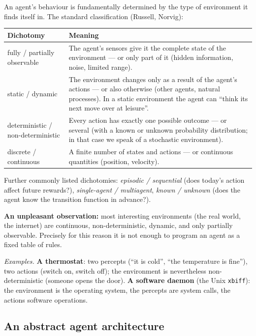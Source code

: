 \documentclass[11pt,a4paper]{article}
\theoremstyle{definition}
\providecommand{\uv}[1]{``#1''}
\begin{document}
An agent's behaviour is fundamentally determined by the type of environment it finds itself in.
The standard classification (Russell, Norvig):

\begin{center}
\begin{tabular}{p{} p{}}
\toprule
\textbf{Dichotomy} & \textbf{Meaning} \\
\midrule
fully / partially observable
  & The agent's sensors give it the complete state of the environment --- or only part of it
    (hidden information, noise, limited range). \\
static / dynamic
  & The environment changes only as a result of the agent's actions --- or also otherwise (other
    agents, natural processes). In a static environment the agent can \uv{think its next move over
    at leisure}. \\
deterministic / non-deterministic
  & Every action has exactly one possible outcome --- or several (with a known or unknown
    probability distribution; in that case we speak of a stochastic environment). \\
discrete / continuous
  & A finite number of states and actions --- or continuous quantities (position, velocity). \\
\bottomrule
\end{tabular}
\end{center}

Further commonly listed dichotomies: \emph{episodic / sequential} (does today's action affect
future rewards?), \emph{single-agent / multiagent}, \emph{known / unknown} (does the agent know the
transition function in advance?).

\textbf{An unpleasant observation:} most interesting environments (the real world, the internet)
are continuous, non-deterministic, dynamic, and only partially observable. Precisely for this
reason it is not enough to program an agent as a fixed table of rules.

\medskip
\noindent\emph{Examples.} \textbf{A thermostat}: two percepts (\uv{it is cold}, \uv{the
temperature is fine}), two actions (switch on, switch off); the environment is nevertheless
non-deterministic (someone opens the door). \textbf{A software daemon} (the Unix
\texttt{xbiff}): the environment is the operating system, the percepts are system calls,
the actions software operations.

\subsection{An abstract agent architecture}
\end{document}
